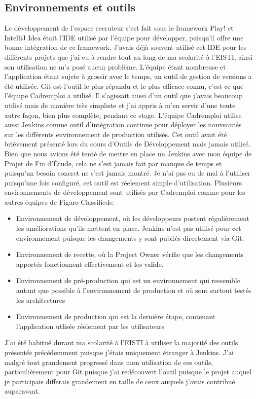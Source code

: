 \subsection{Environnements et outils}
Le développement de l'espace recruteur s'est fait sous le framework Play! et IntelliJ Idea était l'IDE utilisé par l'équipe pour développer, puisqu'il offre une bonne intégration de ce framework.
J'avais déjà souvent utilisé cet IDE pour les différents projets que j'ai eu à rendre tout au long de ma scolarité à l'EISTI, ainsi son utilisation ne m'a posé aucun problème.
L'équipe étant nombreuse et l'application étant sujete à grossir avec le temps, un outil de gestion de versions a été utilisée.
Git est l'outil le plus répandu et le plus efficace connu, c'est ce que l'équipe Cadremploi a utilisé.
Il s'agissait aussi d'un outil que j'avais beaucoup utilisé mais de manière très simpliste et j'ai appris à m'en servir d'une toute autre façon, bien plus complète, pendant ce stage.
L'équipe Cadremploi utilise aussi Jenkins comme outil d'intégration continue pour déployer les nouveautés sur les différents environnement de production utilisés.
Cet outil avait été brièvement présenté lors du cours d'Outils de Développement mais jamais utilisé.
Bien que nous avions été tenté de mettre en place un Jenkins avec mon équipe de Projet de Fin d'Étude, cela ne s'est jamais fait par manque de temps et puisqu'un besoin concret ne s'est jamais montré.
Je n'ai pas eu de mal à l'utiliser puisqu'une fois configuré, cet outil est réelement simple d'utilisation.
Plusieurs environnements de développement sont utilisés par Cadremploi comme pour les autres équipes de Figaro Classifieds:
\begin{itemize}
  \item{Environnement de développement}, où les développeurs postent régulièrement les améliorations qu'ils mettent en place. Jenkins n'est pas utilisé pour cet environnement puisque les changements y sont publiés directement via Git.
  \item{Environnement de recette}, où la Project Owner vérifie que les changements apportés fonctionnent effectivement et les valide.
  \item{Environnement de pré-production} qui est un environnement qui ressemble autant que possible à l'environnement de production et où sont surtout testés les architectures
  \item{Environnement de production} qui est la dernière étape, contenant l'application utlisée réelement par les utilisateurs
\end{itemize}
J'ai été habitué durant ma scolarité à l'EISTI à utiliser la majorité des outils présentés précédemment puisque j'étais uniquement étranger à Jenkins. J'ai malgré tout grandement progressé dans mon utilisation de ces outils, particulièrement pour Git puisque j'ai redécouvert l'outil puisque le projet auquel je participais differais grandement en taille de ceux auquels j'avais contribué auparavant.

